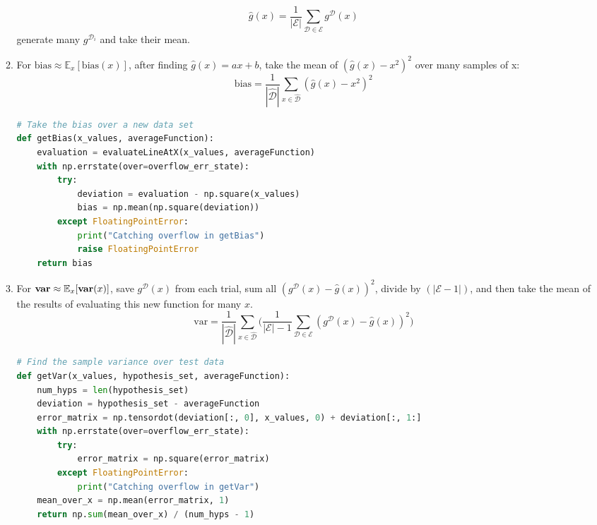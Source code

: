 \documentclass[12pt]{article}
\newcommand{\Data}{\mathcal{D}}
\newcommand{\Exmt}{\mathcal{E}}
\newcommand{\Expect}{\mathbb{E}}
\newcommand{\Bias}{\bm{\mathrm{bias}}}
\newcommand{\Var}{\bm{\mathrm{var}}}
\begin{document}
\begin{enumerate}
\begin{enumerate}
        \begin{equation*}
            \hat{g}(x) = \frac{1}{|\Exmt|} \sum_{\Data \in \Exmt} g^{\Data}(x)
        \end{equation*}
        generate many $g^{\Data_{i}}$ and take their mean.
        \item For $\Bias \approx \Expect_{x}[\Bias(x)]$, after finding $\hat{g}(x) = ax + b$, take the mean of $(\hat{g}(x) - x^{2})^{2}$ over many samples of x:
         \begin{equation*}
            \Bias = 
            \frac{1}{|\widehat{\Data}|}
            \sum_{x \in \widehat{\Data}}(\hat{g}(x)- x^{2})^{2}
        \end{equation*}
        
\begin{lstlisting}[language=Python, caption=Finding $\Bias$]
# Take the bias over a new data set
def getBias(x_values, averageFunction):
    evaluation = evaluateLineAtX(x_values, averageFunction)
    with np.errstate(over=overflow_err_state):
        try:
            deviation = evaluation - np.square(x_values)
            bias = np.mean(np.square(deviation))
        except FloatingPointError:
            print("Catching overflow in getBias")
            raise FloatingPointError
    return bias
\end{lstlisting}
\pagebreak
        \item For $\Var\def\stackbelow#1#2{\underset{\displaystyle\overset{\displaystyle\shortparallel}{#2}}{#1}} \approx \Expect_{x}[\Var(x)]$, save $g^{\Data}(x)$ from each trial, sum all $(g^{\Data}(x) - \hat{g}(x))^{2}$, divide by $(|\Exmt - 1|)$, and then take the mean of the results of evaluating this new function for many $x$.
        \begin{equation*}
            \Var    = 
            \frac{1}{|\widehat{\Data}|}
            \sum_{x \in \widehat{\Data}}
            \Biggl(
                \frac{1}{\mathcal{|E|}-1}
                \sum_{\Data \in \Exmt}
                        (g^{\Data}(x) - \hat{g}(x))^{2}
            \Biggr)
        \end{equation*}
        
\begin{lstlisting}[language=Python, caption=Finding $\Var$]
# Find the sample variance over test data
def getVar(x_values, hypothesis_set, averageFunction):
    num_hyps = len(hypothesis_set)
    deviation = hypothesis_set - averageFunction
    error_matrix = np.tensordot(deviation[:, 0], x_values, 0) + deviation[:, 1:]
    with np.errstate(over=overflow_err_state):
        try:
            error_matrix = np.square(error_matrix)
        except FloatingPointError:
            print("Catching overflow in getVar")
    mean_over_x = np.mean(error_matrix, 1)
    return np.sum(mean_over_x) / (num_hyps - 1)
\end{lstlisting}


\end{enumerate}
\end{enumerate}
\end{document}
